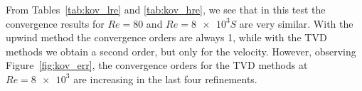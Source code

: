From Tables~\ref{tab:kov_lre} and \ref{tab:kov_hre}, we see that in this test 
the convergence results for $Re=80$ and $Re=\num{8e3}S$ are very similar. With 
the upwind method the convergence orders are always 1, while with the TVD 
methods we obtain a second order, but only for the velocity. However, observing 
Figure~\ref{fig:kov_err}, the convergence orders for the TVD methods at 
$Re=\num{8e3}$ are increasing in the last four refinements.
%
